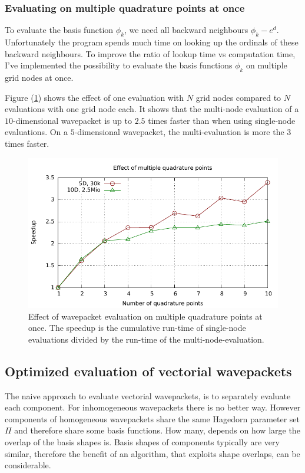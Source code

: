 \documentclass{article}
\begin{document}
\subsubsection{Evaluating on multiple quadrature points at once}

To evaluate the basis function \(\phi_k\), we need all backward neighbours
\(\phi_k-e^d\).
Unfortunately the program spends much time on looking up the ordinals of these
backward neighbours. To improve the ratio of lookup time vs computation time,
I've implemented the possibility to evaluate the basis functions \(\phi_k\)
on multiple grid nodes at once.

Figure (\ref{fig:hawp_eval_multiqp}) shows the effect of one
evaluation with \(N\) grid nodes compared to \(N\) evaluations with one
grid node each. It shows that the multi-node evaluation of a \(10\)-dimensional
wavepacket is up to \(2.5\) times faster than when using single-node evaluations.
On a \(5\)-dimensional wavepacket, the multi-evaluation is more the \(3\) times faster.

\begin{figure}[H]
  \centering
  \includegraphics[width=1.0\textwidth]{plots/hawp_eval_multiqp}
  \caption{
    Effect of wavepacket evaluation on multiple quadrature points at once.
    The speedup is the cumulative run-time of single-node evaluations divided by
    the run-time of the multi-node-evaluation.
  }
  \label{fig:hawp_eval_multiqp}
\end{figure}

\subsection{Optimized evaluation of vectorial wavepackets} \label{sec:vector_hawp_eval}
The naive approach to evaluate vectorial wavepackets, is to separately
evaluate each component. For inhomogeneous wavepackets there is
no better way.
However components of homogeneous wavepackets share the same Hagedorn parameter set \(\Pi\)
and therefore share some basis functions. How many, depends on how large the overlap of
the basis shapes is. Basis shapes of components typically are very similar, therefore
the benefit of an algorithm, that exploits shape overlaps, can be considerable.
\end{document}
